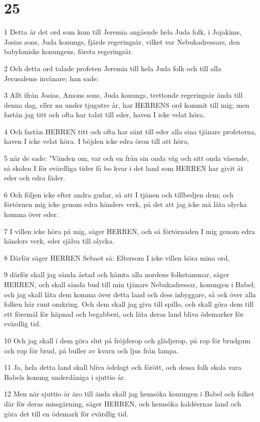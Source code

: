 \chapter{25}

\par 1 Detta är det ord som kom till Jeremia angående hela Juda folk, i Jojakims, Josias sons, Juda konungs, fjärde regeringsår, vilket var Nebukadressars, den babyloniske konungens, första regeringsår.
\par 2 Och detta ord talade profeten Jeremia till hela Juda folk och till alla Jerusalems invånare; han sade:
\par 3 Allt ifrån Josias, Amons sons, Juda konungs, trettonde regeringsår ända till denna dag, eller nu under tjugutre år, har HERRENS ord kommit till mig; men fastän jag titt och ofta har talat till eder, haven I icke velat höra.
\par 4 Och fastän HERREN titt och ofta har sänt till eder alla sina tjänare profeterna, haven I icke velat höra. I böjden icke edra öron till att höra,
\par 5 när de sade: "Vänden om, var och en från sin onda väg och sitt onda väsende, så skolen I för evärdliga tider få bo kvar i det land som HERREN har givit åt eder och edra fäder.
\par 6 Och följen icke efter andra gudar, så att I tjänen och tillbedjen dem; och förtörnen mig icke genom edra händers verk, på det att jag icke må låta olycka komma över eder.
\par 7 I villen icke höra på mig, säger HERREN, och så förtörnaden I mig genom edra händers verk, eder själva till olycka.
\par 8 Därför säger HERREN Sebaot så: Eftersom I icke villen höra mina ord,
\par 9 därför skall jag sända åstad och hämta alla nordens folkstammar, säger HERREN, och skall sända bud till min tjänare Nebukadressar, konungen i Babel; och jag skall låta dem komma över detta land och dess inbyggare, så ock över alla folken här runt omkring. Och dem skall jag giva till spillo, och skall göra dem till ett föremål för häpnad och begabberi, och låta deras land bliva ödemarker för evärdlig tid.
\par 10 Och jag skall i dem göra slut på fröjderop och glädjerop, på rop för brudgum och rop för brud, på buller av kvarn och ljus från lampa.
\par 11 Ja, hela detta land skall bliva ödelagt och förött, och dessa folk skola vara Babels konung underdåniga i sjuttio år.
\par 12 Men när sjuttio år äro till ända skall jag hemsöka konungen i Babel och folket där för deras missgärning, säger HERREN, och hemsöka kaldéernas land och göra det till en ödemark för evärdlig tid.
